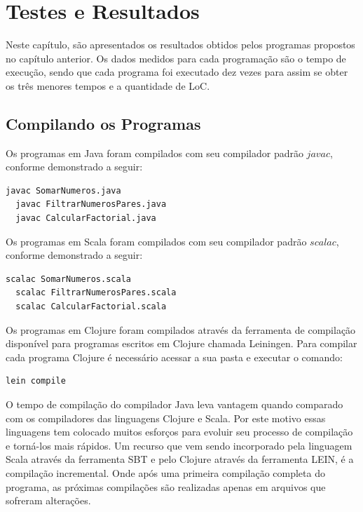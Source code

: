 \chapter{Testes e Resultados}

\vspace{-1.9cm}

Neste capítulo, são apresentados os resultados obtidos pelos programas propostos no capítulo anterior. Os dados medidos para cada programação são o tempo de execução, sendo que cada programa foi executado dez vezes para assim se obter os três menores tempos e a quantidade de \ac{LoC}.

\section{Compilando os Programas}

  Os programas em Java foram compilados com seu compilador padrão $javac$, conforme demonstrado a seguir:

  \begin{lstlisting}[mathescape=false]
  javac SomarNumeros.java
  javac FiltrarNumerosPares.java
  javac CalcularFactorial.java
  \end{lstlisting}

  Os programas em Scala foram compilados com seu compilador padrão $scalac$, conforme demonstrado a seguir:

  \begin{lstlisting}[mathescape=false]
  scalac SomarNumeros.scala
  scalac FiltrarNumerosPares.scala
  scalac CalcularFactorial.scala
  \end{lstlisting}

  Os programas em Clojure foram compilados através da ferramenta de compilação disponível para programas escritos em Clojure chamada Leiningen. Para compilar cada programa Clojure é necessário acessar a sua pasta e executar o comando:

  \begin{lstlisting}[mathescape=false]
  lein compile
  \end{lstlisting}

  O tempo de compilação do compilador Java leva vantagem quando comparado com os compiladores das linguagens Clojure e Scala. Por este motivo essas linguagens tem colocado muitos esforços para evoluir seu processo de compilação e torná-los mais rápidos. Um recurso que vem sendo incorporado pela linguagem Scala através da ferramenta SBT e pelo Clojure através da ferramenta LEIN, é a compilação incremental. Onde após uma primeira compilação completa do programa, as próximas compilações são realizadas apenas em arquivos que sofreram alterações.

